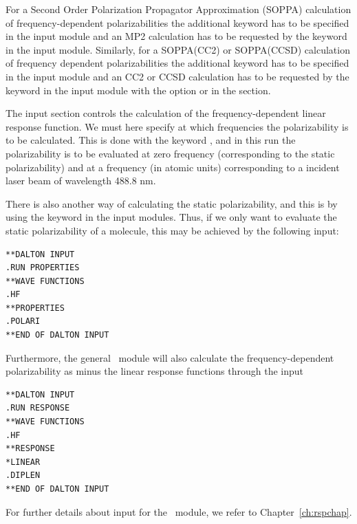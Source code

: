 For a Second Order Polarization Propagator Approximation
(SOPPA)
\cite{esnpjjodjcp73,jopjdycpr2,mjpekdtehjajjojcp,ekdspasjpca102}
calculation of frequency-dependent polarizabilities the additional
keyword  has to be specified in the  input
module and an MP2 calculation has to be requested by the keyword
 in the  input module. Similarly, for a
SOPPA(CC2)  \cite{spas097}
 or SOPPA(CCSD) \cite{soppaccsd,ekdspasjpca102}
calculation of frequency dependent polarizabilities the additional
keyword  has to be specified in the 
input module and an CC2 or CCSD calculation has to be requested by the
keyword  in the  input module with the
option  or  in the  section.

The  input section controls the calculation of the
frequency-dependent linear response
function.
We must here specify at which frequencies the polarizability is
to be calculated. This is done with the keyword , and in
this run the polarizability is to be evaluated at zero frequency
(corresponding to the static polarizability) and at a frequency (in
atomic units) corresponding to a incident laser beam of wavelength
488.8 nm.

There is also another way of calculating the static
 polarizability, and this is by using the
keyword  in the  input modules. Thus, if we only
want to evaluate the static polarizability of a molecule, this may be
achieved by the following input:

\begin{verbatim}
**DALTON INPUT
.RUN PROPERTIES
**WAVE FUNCTIONS
.HF
**PROPERTIES
.POLARI
**END OF DALTON INPUT
\end{verbatim}

Furthermore, the general \response\ module will also calculate the
frequency-dependent polarizability
as minus the linear response functions through the input


\begin{verbatim}
**DALTON INPUT
.RUN RESPONSE
**WAVE FUNCTIONS
.HF
**RESPONSE
*LINEAR
.DIPLEN
**END OF DALTON INPUT
\end{verbatim}
For further details about input for the \response\ module, we refer
to Chapter~\ref{ch:rspchap}.
